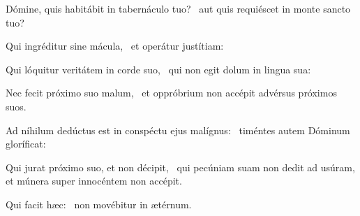 \item Dómine, quis habitábit in tabernáculo tuo?~\psstar{} aut quis requiéscet in monte sancto tuo?

\item Qui ingréditur sine mácula,~\psstar{} et operátur justítiam:

\item Qui lóquitur veritátem in corde suo,~\psstar{} qui non egit dolum in lingua sua:

\item Nec fecit próximo suo malum,~\psstar{} et oppróbrium non accépit advérsus próximos suos.

\item Ad níhilum dedúctus est in conspéctu ejus malígnus:~\psstar{} timéntes autem Dóminum gloríficat:

\item Qui jurat próximo suo, et non décipit,~\psstar{} qui pecúniam suam non dedit ad usúram, et múnera super innocéntem non accépit.

\item Qui facit hæc:~\psstar{} non movébitur in ætérnum.
